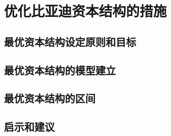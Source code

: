 \chapter{优化比亚迪资本结构的措施}


\section{最优资本结构设定原则和目标}


\section{最优资本结构的模型建立}


\section{最优资本结构的区间}

\section{启示和建议}
